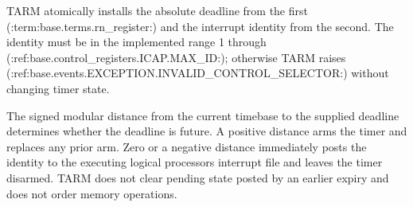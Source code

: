 TARM atomically installs the absolute deadline from the first (:term:base.terms.rn_register:) and the interrupt
identity from the second. The identity must be in the implemented range 1 through (:ref:base.control_registers.ICAP.MAX_ID:); otherwise
TARM raises
(:ref:base.events.EXCEPTION.INVALID_CONTROL_SELECTOR:) without changing timer state.

The signed modular distance from the current timebase to the supplied deadline determines whether the deadline is
future. A positive distance arms the timer and replaces any prior arm. Zero or a negative distance immediately posts
the identity to the executing logical processor\textquotesingle{}s interrupt file and leaves the timer disarmed.
TARM does not clear pending state posted by an earlier expiry and does not order memory operations.

